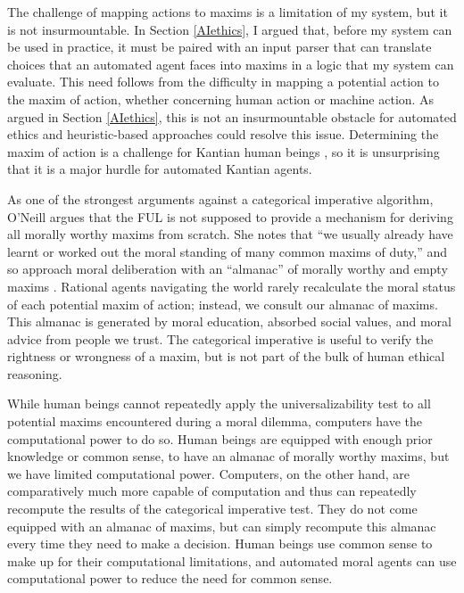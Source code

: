 \begin{isabellebody}
\begin{isamarkuptext}
The challenge of mapping actions to maxims is a limitation of my system, but it is not insurmountable. In Section \ref{AIethics},
I argued that, before my system can be used in practice, it must be paired with an input parser that can
translate choices that an automated agent faces into maxims in a logic that my system can
evaluate. This need follows from the difficulty in mapping a potential action
to the maxim of action, whether concerning human action or machine action. As argued in Section \ref{AIethics},  
this is not an insurmountable obstacle for automated ethics and heuristic-based approaches could resolve
this issue. Determining the maxim of action is a challenge for Kantian human beings \citep{oneilluniversallaws}, 
so it is unsurprising that it is a major hurdle for automated Kantian agents. 

As one of the strongest arguments against a categorical imperative algorithm, O'Neill argues that 
the FUL is not supposed to provide a mechanism for deriving all morally worthy maxims from scratch. She notes
that ``we usually already have learnt or worked out the moral standing of many common maxims of duty,''
and so approach moral deliberation with an ``almanac'' of morally worthy and empty maxims \citep[394]{oneilluniversallaws}. 
Rational agents navigating the world rarely recalculate the moral status of each potential maxim of 
action; instead, we consult our almanac of maxims. This almanac is generated by moral education, 
absorbed social values, and moral advice from people we trust. The categorical imperative is useful 
to verify the rightness or wrongness of a maxim, but is not part of the bulk of human ethical reasoning.

While human beings cannot repeatedly apply the universalizability test to all potential maxims encountered during 
a moral dilemma, computers have the computational power to do so. Human beings are 
equipped with enough prior knowledge or common sense, to have an almanac of morally worthy maxims,
but we have limited computational power. Computers, on the other hand, are comparatively
much more capable of computation and thus can repeatedly recompute the results of the categorical
imperative test. They do not come equipped with an almanac of maxims, but can simply recompute this
almanac every time they need to make a decision. Human beings use common sense to make up for their computational
limitations, and automated moral agents can use computational power to reduce the need for common sense.


\end{isamarkuptext}
\end{isabellebody}
